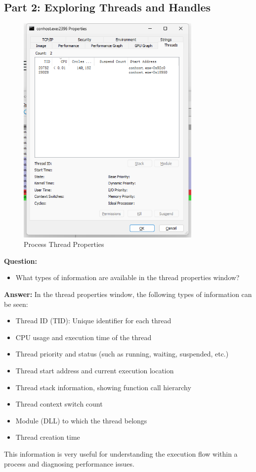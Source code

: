 \documentclass[12pt,a4paper]{article}
\begin{document}
\subsection{Part 2: Exploring Threads and Handles}

\begin{figure}[H]
    \centering
    \includegraphics[width=0.8\textwidth]{Thread.png}
    \caption{Process Thread Properties}
    \label{fig:thread}
\end{figure}

\textbf{Question:}
\begin{itemize}
    \item What types of information are available in the thread properties window?
\end{itemize}

\textbf{Answer:}
In the thread properties window, the following types of information can be seen:
\begin{itemize}
    \item Thread ID (TID): Unique identifier for each thread
    \item CPU usage and execution time of the thread
    \item Thread priority and status (such as running, waiting, suspended, etc.)
    \item Thread start address and current execution location
    \item Thread stack information, showing function call hierarchy
    \item Thread context switch count
    \item Module (DLL) to which the thread belongs
    \item Thread creation time
\end{itemize}
This information is very useful for understanding the execution flow within a process and diagnosing performance issues.
\end{document}
